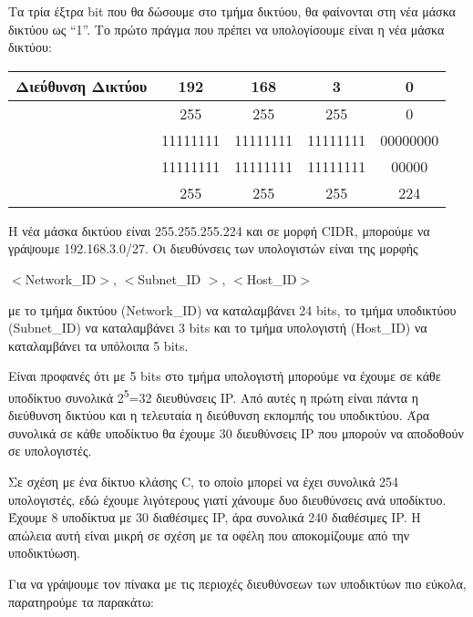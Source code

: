 Τα τρία έξτρα bit που θα δώσουμε στο τμήμα δικτύου, θα φαίνονται στη νέα μάσκα δικτύου ως ``1''. Το πρώτο πράγμα που πρέπει να υπολογίσουμε είναι η νέα μάσκα δικτύου:

\begin{center}
\fontsize{11}{13}
\ttfamily
\begin{tabular}{|c|c|c|c|c|}
\hline
 \textbf{Διεύθυνση Δικτύου} & 192 & 168 & 3 & 0 \\ 
\hline
\multirow{2}{*}{} \textbf{Παλιά Μάσκα} & 255 & 255 & 255  & 0 \\ 
\cline{2-5} 
              \textbf{Δικτύου} & 11111111  & 11111111 & 11111111 & 00000000 \\ 
\hline
\multirow{2}{*}{} \textbf{Νέα Μάσκα} & 11111111 & 11111111 & 11111111 & \colorbox{red}{\color{white}{111}}00000  \\ 
\cline{2-5} 
             \textbf{Υποδικτύου} & 255 & 255 & 255 & 224 \\ 
\hline
\end{tabular}
\normalfont
\end{center}

Η νέα μάσκα δικτύου είναι 255.255.255.224 και σε μορφή CIDR, μπορούμε να γράψουμε 192.168.3.0/27. Οι διευθύνσεις των υπολογιστών είναι της μορφής

$<$Network\_ID$>$, $<$Subnet\_ID $>$, $<$Host\_ID$>$

με το τμήμα δικτύου (Network\_ID) να καταλαμβάνει 24 bits, το τμήμα υποδικτύου (Subnet\_ID) να καταλαμβάνει 3 bits και το τμήμα υπολογιστή (Host\_ID) να καταλαμβάνει τα υπόλοιπα 5 bits.

Είναι προφανές ότι με 5 bits στο τμήμα υπολογιστή μπορούμε να έχουμε σε κάθε υποδίκτυο συνολικά 2\textsuperscript{5}=32 διευθύνσεις IP. Από αυτές η πρώτη είναι πάντα η διεύθυνση δικτύου και η τελευταία η διεύθυνση εκπομπής του υποδικτύου. Άρα συνολικά σε κάθε υποδίκτυο θα έχουμε 30 διευθύνσεις IP που μπορούν να αποδοθούν σε υπολογιστές.

Σε σχέση με ένα δίκτυο κλάσης C, το οποίο μπορεί να έχει συνολικά 254 υπολογιστές, εδώ έχουμε λιγότερους γιατί χάνουμε δυο διευθύνσεις ανά υποδίκτυο. Έχουμε 8 υποδίκτυα με 30 διαθέσιμες IP, άρα συνολικά 240 διαθέσιμες IP. Η απώλεια αυτή είναι μικρή σε σχέση με τα οφέλη που αποκομίζουμε από την υποδικτύωση.

Για να γράψουμε τον πίνακα με τις περιοχές διευθύνσεων των υποδικτύων πιο εύκολα, παρατηρούμε τα παρακάτω:

